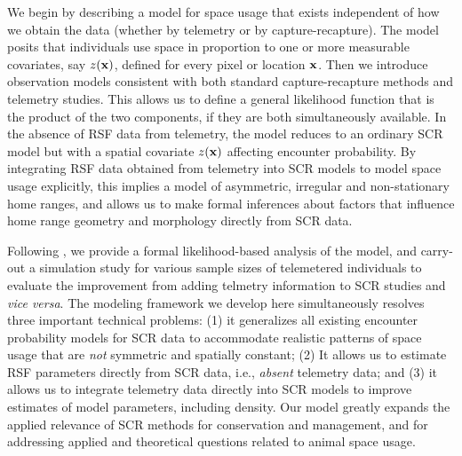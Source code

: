 We begin by
describing a model for space usage that exists independent of how we
obtain the data (whether by telemetry or by capture-recapture). The
model posits that individuals use space in proportion to one or more
measurable covariates, say $z({\bf x})$, defined for every pixel or
location ${\bf x}$.  Then we introduce observation models consistent
with both standard capture-recapture methods and telemetry studies.  This
allows us to define a general likelihood function that is the product
of the two components, if they are both simultaneously available.  In
the absence of RSF data from telemetry, the model reduces to an
ordinary SCR model but with a spatial covariate $z({\bf x})$ affecting
encounter probability.
By integrating RSF data obtained from
telemetry into SCR models to model space usage explicitly, this
implies a model of asymmetric, irregular and non-stationary home ranges, and
allows us to make formal inferences about factors that influence home
range geometry and morphology directly from SCR data.


Following \citet{borchers_efford:2008}, we provide a formal
likelihood-based analysis of the model, and carry-out a simulation
study for various sample sizes of telemetered individuals to evaluate
the improvement from adding telmetry information to SCR studies and
{\it vice versa}.  The modeling framework we develop here
simultaneously resolves three important technical problems: (1) it
generalizes all existing encounter probability models for SCR data to
accommodate realistic patterns of space usage that are {\it not}
symmetric and spatially constant; (2) It allows us to estimate RSF
parameters directly from SCR data, i.e., {\it absent} telemetry data;
and (3) it allows us to integrate telemetry data directly into SCR
models to improve estimates of model parameters, including density.
Our model greatly expands the applied relevance of SCR methods for
conservation and management, and for addressing applied and
theoretical questions related to animal space usage.

